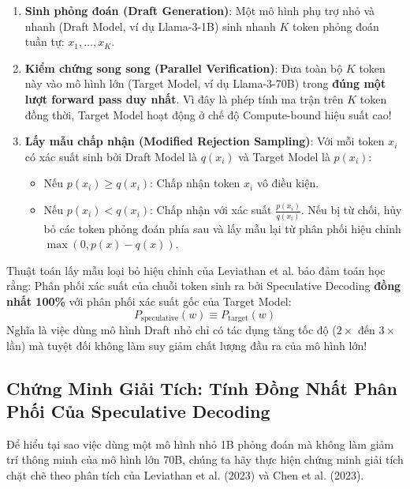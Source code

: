 \begin{enumerate}
  \item \textbf{Sinh phỏng đoán (Draft Generation)}: Một mô hình phụ trợ nhỏ và nhanh (Draft Model, ví dụ Llama-3-1B) sinh nhanh $K$ token phỏng đoán tuần tự: $x_1, \dots, x_K$.
  \item \textbf{Kiểm chứng song song (Parallel Verification)}: Đưa toàn bộ $K$ token này vào mô hình lớn (Target Model, ví dụ Llama-3-70B) trong \textbf{đúng một lượt forward pass duy nhất}. Vì đây là phép tính ma trận trên $K$ token đồng thời, Target Model hoạt động ở chế độ Compute-bound hiệu suất cao!
  \item \textbf{Lấy mẫu chấp nhận (Modified Rejection Sampling)}:
  Với mỗi token $x_i$ có xác suất sinh bởi Draft Model là $q(x_i)$ và Target Model là $p(x_i)$:
  \begin{itemize}
    \item Nếu $p(x_i) \ge q(x_i)$: Chấp nhận token $x_i$ vô điều kiện.
    \item Nếu $p(x_i) < q(x_i)$: Chấp nhận với xác suất $\frac{p(x_i)}{q(x_i)}$. Nếu bị từ chối, hủy bỏ các token phỏng đoán phía sau và lấy mẫu lại từ phân phối hiệu chỉnh $\max(0, p(x) - q(x))$.
  \end{itemize}
\end{enumerate}

\begin{theorem}
Thuật toán lấy mẫu loại bỏ hiệu chỉnh của Leviathan et al. bảo đảm toán học rằng: Phân phối xác suất của chuỗi token sinh ra bởi Speculative Decoding \textbf{đồng nhất 100\%} với phân phối xác suất gốc của Target Model:
\begin{equation}
P_{\text{speculative}}(w) \equiv P_{\text{target}}(w)
\end{equation}
Nghĩa là việc dùng mô hình Draft nhỏ chỉ có tác dụng tăng tốc độ ($2\times$ đến $3\times$ lần) mà tuyệt đối không làm suy giảm chất lượng đầu ra của mô hình lớn!
\end{theorem}

\subsection{Chứng Minh Giải Tích: Tính Đồng Nhất Phân Phối Của Speculative Decoding}
\label{sec:speculative-math-proof}

Để hiểu tại sao việc dùng một mô hình nhỏ 1B phỏng đoán mà không làm giảm trí thông minh của mô hình lớn 70B, chúng ta hãy thực hiện chứng minh giải tích chặt chẽ theo phân tích của Leviathan et al. (2023) và Chen et al. (2023).

